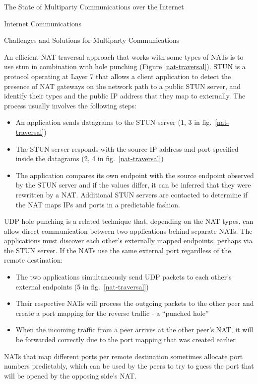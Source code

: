 \begin{frame}[fragile]{The State of Multiparty Communications over the Internet}
\begin{block}{Internet Communications}
\begin{block}{Challenges and Solutions for Multiparty Communications}

An efficient NAT traversal approach that works with some types of NATs is to use \gls{stun} \autocite{stunRFC} in combination with  hole punching (Figure \ref{nat-traversal}). STUN is a protocol operating at Layer 7 that allows a client application to detect the presence of NAT gateways on the network path to a public STUN server, and identify their types and the public IP address that they map to externally. The process usually involves the following steps:

\begin{itemize}
\tightlist
\item
  An application sends  datagrams to the STUN server (1, 3 in fig.~\ref{nat-traversal})
\item
  The STUN server responds with the source IP address and port specified inside the datagrams (2, 4 in fig.~\ref{nat-traversal})
\item
  The application compares its own endpoint with the source endpoint observed by the STUN server and if the values differ, it can be inferred that they were rewritten by a NAT. Additional STUN servers are contacted to determine if the NAT maps IPs and ports in a predictable fashion.
\end{itemize}

UDP hole punching is a related technique that, depending on the NAT types, can allow direct communication between two applications behind separate NATs. The applications must discover each other's externally mapped endpoints, perhaps via the STUN server.  If the NATs use the same external port regardless of the remote destination:

\begin{itemize}
\tightlist
\item
  The two applications simultaneously send UDP packets to each other's external endpoints (5 in fig.~\ref{nat-traversal})
\item
  Their respective NATs will process the outgoing packets to the other peer and create a port mapping for the reverse traffic - a ``punched hole''
\item
  When the incoming traffic from a peer arrives at the other peer's NAT, it will be forwarded correctly due to the port mapping that was created earlier
\end{itemize}

NATs that map different ports per remote destination sometimes allocate port numbers predictably, which can be used by the peers to try to guess the port that will be opened by the opposing side's NAT.


\end{block}
\end{block}
\end{frame}
